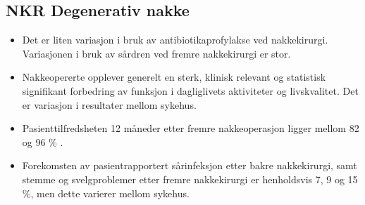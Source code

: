 \subsection*{NKR Degenerativ nakke}
\begin{itemize}
\item Det er liten variasjon i bruk av antibiotikaprofylakse ved nakkekirurgi. Variasjonen i bruk av sårdren ved fremre nakkekirurgi er stor.
\item Nakkeopererte opplever generelt en sterk, klinisk relevant og statistisk
signifikant forbedring av funksjon i dagliglivets aktiviteter og livskvalitet. Det er variasjon i resultater mellom sykehus.
\item Pasienttilfredsheten 12 måneder etter fremre nakkeoperasjon ligger mellom 82 og 96 \% .
\item Forekomsten av pasientrapportert sårinfeksjon etter bakre nakkekirurgi, samt stemme og svelgproblemer etter fremre nakkekirurgi er henholdsvis 7, 9 og 15 \%, men dette varierer mellom sykehus.
\end{itemize} 












